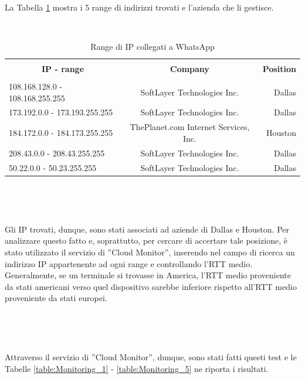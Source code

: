 \documentclass[a4paper,11pt]{book}
\begin{document}
~

La Tabella \ref{table:ip} mostra i 5 range di indirizzi trovati e l'azienda che li gestisce.

~

\begin{table}[h]
\label{table:ip}
\begin{tabular}{|l|c|r|}
\hline
\multicolumn{1}{|c|}{\textbf{}} & {\textbf{}} & {\textbf{}}\\
\multicolumn{1}{|c|}{\textbf{IP - range}} & {\textbf{Company}} & {\textbf{Position}}\\
\multicolumn{1}{|c|}{\textbf{}} & {\textbf{}} & {\textbf{}}\\
\hline
108.168.128.0 - 108.168.255.255 &  SoftLayer Technologies Inc. & Dallas\\
173.192.0.0 - 173.193.255.255 &  SoftLayer Technologies Inc. & Dallas\\
184.172.0.0 - 184.173.255.255 &  ThePlanet.com Internet Services, Inc. & Houston\\
208.43.0.0 - 208.43.255.255 &  SoftLayer Technologies Inc. & Dallas\\
50.22.0.0 - 50.23.255.255 &  SoftLayer Technologies Inc. & Dallas\\
\hline
\end{tabular}
\caption{Range di IP collegati a WhatsApp}
\end{table}


~

~


Gli IP trovati, dunque, sono stati associati ad aziende di Dallas e Houston. 
Per analizzare questo fatto e, soprattutto, per cercare di accertare tale posizione, \`e stato utilizzato il servizio di ''Cloud Monitor'', inserendo nel campo di ricerca un indirizzo IP appartenente ad ogni range e controllando l'RTT medio. 
Generalmente, se un terminale si trovasse in America, l'RTT medio proveniente da stati americani verso quel dispositivo sarebbe inferiore rispetto all'RTT medio proveniente da stati europei.

~

~

Attraverso il servizio di ''Cloud Monitor'', dunque, sono stati fatti questi test e le Tabelle \ref{table:Monitoring_1} - \ref{table:Monitoring_5} ne riporta i risultati.

~
\clearpage
\end{document}
